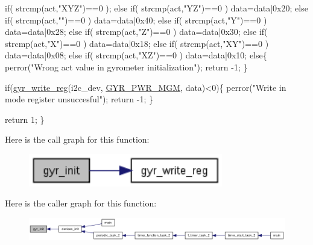 \begin{DoxyCode}
  \textcolor{keywordflow}{if}( strcmp(act,\textcolor{stringliteral}{"XYZ"})==0 );
  \textcolor{keywordflow}{else} \textcolor{keywordflow}{if}( strcmp(act,\textcolor{stringliteral}{"YZ"})==0 )
      data=data|0x20;
  \textcolor{keywordflow}{else} \textcolor{keywordflow}{if}( strcmp(act,\textcolor{stringliteral}{""})==0 )
      data=data|0x40;
  \textcolor{keywordflow}{else} \textcolor{keywordflow}{if}( strcmp(act,\textcolor{stringliteral}{"Y"})==0 )
      data=data|0x28;
  \textcolor{keywordflow}{else} \textcolor{keywordflow}{if}( strcmp(act,\textcolor{stringliteral}{"Z"})==0 )
      data=data|0x30;
  \textcolor{keywordflow}{else} \textcolor{keywordflow}{if}( strcmp(act,\textcolor{stringliteral}{"X"})==0 )
      data=data|0x18;
  \textcolor{keywordflow}{else} \textcolor{keywordflow}{if}( strcmp(act,\textcolor{stringliteral}{"XY"})==0 )
      data=data|0x08;
  \textcolor{keywordflow}{else} \textcolor{keywordflow}{if}( strcmp(act,\textcolor{stringliteral}{"XZ"})==0 )
      data=data|0x10;
  \textcolor{keywordflow}{else}\{
    perror(\textcolor{stringliteral}{"Wrong act value in gyrometer initialization"});
    \textcolor{keywordflow}{return} -1;
  \}
   
  \textcolor{keywordflow}{if}(\hyperlink{group__gyr_ga3eba167b8ab0614bfe7bafeae8b5570d}{gyr\_write\_reg}(i2c\_dev, \hyperlink{imu__regs_8h_a5eba4af610a1ec85320e940bf44855eb}{GYR\_PWR\_MGM}, data)<0)\{
    perror(\textcolor{stringliteral}{"Write in mode register unsuccesful"});
    \textcolor{keywordflow}{return} -1;
  \}
  
  \textcolor{keywordflow}{return} 1;
\}
\end{DoxyCode}


Here is the call graph for this function\-:
\nopagebreak
\begin{figure}[H]
\begin{center}
\leavevmode
\includegraphics[width=240pt]{group__gyr_ga6d02be352b4491a236c9695a6a24d174_cgraph}
\end{center}
\end{figure}




Here is the caller graph for this function\-:
\nopagebreak
\begin{figure}[H]
\begin{center}
\leavevmode
\includegraphics[width=350pt]{group__gyr_ga6d02be352b4491a236c9695a6a24d174_icgraph}
\end{center}
\end{figure}


